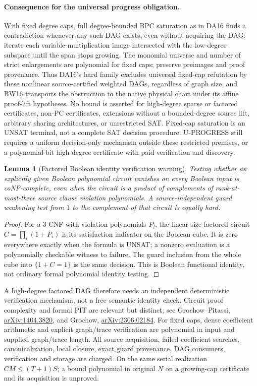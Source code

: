 \documentclass[11pt]{article}
\newtheorem{lemma}[theorem]{Lemma}
\begin{document}
\paragraph{Consequence for the universal progress obligation.}
With fixed degree caps, full degree-bounded BPC saturation as in DA16 finds a contradiction whenever any such DAG exists, even without acquiring the DAG: iterate each variable-multiplication image intersected with the low-degree subspace until the span stops growing. The monomial universe and number of strict enlargements are polynomial for fixed caps; preserve preimages and proof provenance. Thus DA16's hard family excludes universal fixed-cap refutation by these nonlinear source-certified weighted DAGs, regardless of graph size, and BW16 transports the obstruction to the native physical chart under its affine proof-lift hypotheses. No bound is asserted for high-degree sparse or factored certificates, non-PC certificates, extensions without a bounded-degree source lift, arbitrary sharing architectures, or unrestricted SAT. Fixed-cap saturation is an UNSAT terminal, not a complete SAT decision procedure. U-PROGRESS still requires a uniform decision-only mechanism outside these restricted premises, or a polynomial-bit high-degree certificate with paid verification and discovery.

\begin{lemma}[Factored Boolean identity verification warning]\label{lem:bd16-identity}
Testing whether an explicitly given Boolean polynomial circuit vanishes on every Boolean input is coNP-complete, even when the circuit is a product of complements of rank-at-most-three source clause violation polynomials. A source-independent guard weakening test from $1$ to the complement of that circuit is equally hard.
\end{lemma}
\begin{proof}
For a 3-CNF with violation polynomials $P_i$, the linear-size factored circuit $C=\prod_i(1+P_i)$ is its satisfaction indicator on the Boolean cube. It is zero everywhere exactly when the formula is UNSAT; a nonzero evaluation is a polynomially checkable witness to failure. The guard inclusion from the whole cube into $\{1+C=1\}$ is the same decision. This is Boolean functional identity, not ordinary formal polynomial identity testing.
\end{proof}
A high-degree factored DAG therefore needs an independent deterministic verification mechanism, not a free semantic identity check. Circuit proof complexity and formal PIT are relevant but distinct; see Grochow--Pitassi, \href{https://arxiv.org/abs/1404.3820}{arXiv:1404.3820}, and Grochow, \href{https://arxiv.org/abs/2306.02184}{arXiv:2306.02184}. For fixed caps, dense coefficient arithmetic and explicit graph/trace verification are polynomial in input and supplied graph/trace length. All source acquisition, failed coefficient searches, canonicalization, local closure, exact guard provenance, DAG consumers, verification and storage are charged. On the same serial realization $CM\le(T+1)S$; a bound polynomial in original $N$ on a growing-cap certificate and its acquisition is unproved.
\end{document}
